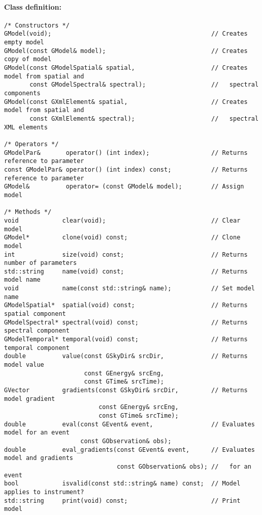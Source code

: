 \documentclass{article}[12pt,a4]
\begin{document}
\paragraph{Class definition:}
\begin{verbatim}
/* Constructors */
GModel(void);                                            // Creates empty model
GModel(const GModel& model);                             // Creates copy of model
GModel(const GModelSpatial& spatial,                     // Creates model from spatial and
       const GModelSpectral& spectral);                  //   spectral components
GModel(const GXmlElement& spatial,                       // Creates model from spatial and
       const GXmlElement& spectral);                     //   spectral XML elements

/* Operators */
GModelPar&       operator() (int index);                 // Returns reference to parameter
const GModelPar& operator() (int index) const;           // Returns reference to parameter
GModel&          operator= (const GModel& model);        // Assign model

/* Methods */
void            clear(void);                             // Clear model
GModel*         clone(void) const;                       // Clone model
int             size(void) const;                        // Returns number of parameters
std::string     name(void) const;                        // Returns model name
void            name(const std::string& name);           // Set model name
GModelSpatial*  spatial(void) const;                     // Returns spatial component
GModelSpectral* spectral(void) const;                    // Returns spectral component
GModelTemporal* temporal(void) const;                    // Returns temporal component
double          value(const GSkyDir& srcDir,             // Returns model value
                      const GEnergy& srcEng,
                      const GTime& srcTime); 
GVector         gradients(const GSkyDir& srcDir,         // Returns model gradient
                          const GEnergy& srcEng,
                          const GTime& srcTime); 
double          eval(const GEvent& event,                // Evaluates model for an event
                     const GObservation& obs);
double          eval_gradients(const GEvent& event,      // Evaluates model and gradients
                               const GObservation& obs); //   for an event
bool            isvalid(const std::string& name) const;  // Model applies to instrument?
std::string     print(void) const;                       // Print model
\end{verbatim}
\end{document}
